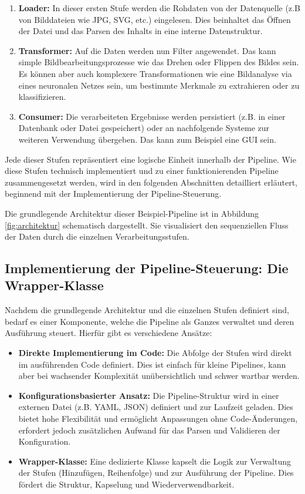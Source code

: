 \documentclass[a4paper]{article} %
\begin{document}
\begin{enumerate}
    \item \textbf{Loader:} In dieser ersten Stufe werden die Rohdaten von der Datenquelle (z.B von Bilddateien wie JPG, SVG, etc.) eingelesen. Dies beinhaltet das Öffnen der Datei und das Parsen des Inhalts in eine interne Datenstruktur.
    \item \textbf{Transformer:} Auf die Daten werden nun Filter angewendet. Das kann simple Bildbearbeitungsprozesse wie das Drehen oder Flippen des Bildes sein. Es können aber auch komplexere Transformationen wie eine Bildanalyse via eines neuronalen Netzes sein, um bestimmte Merkmale zu extrahieren oder zu klassifizieren.
    \item \textbf{Consumer:} Die verarbeiteten Ergebnisse werden persistiert (z.B. in einer Datenbank oder Datei gespeichert) oder an nachfolgende Systeme zur weiteren Verwendung übergeben. Das kann zum Beispiel eine GUI sein.
\end{enumerate}

Jede dieser Stufen repräsentiert eine logische Einheit innerhalb der Pipeline. Wie diese Stufen technisch implementiert und zu einer funktionierenden Pipeline zusammengesetzt werden, wird in den folgenden Abschnitten detailliert erläutert, beginnend mit der Implementierung der Pipeline-Steuerung.

Die grundlegende Architektur dieser Beispiel-Pipeline ist in Abbildung \ref{fig:architektur} schematisch dargestellt. Sie visualisiert den sequenziellen Fluss der Daten durch die einzelnen Verarbeitungsstufen.

\subsection{Implementierung der Pipeline-Steuerung: Die Wrapper-Klasse}
Nachdem die grundlegende Architektur und die einzelnen Stufen definiert sind, bedarf es einer Komponente, welche die Pipeline als Ganzes verwaltet und deren Ausführung steuert. Hierfür gibt es verschiedene Ansätze:

\begin{itemize}
    \item \textbf{Direkte Implementierung im Code:} Die Abfolge der Stufen wird direkt im ausführenden Code definiert. Dies ist einfach für kleine Pipelines, kann aber bei wachsender Komplexität unübersichtlich und schwer wartbar werden.
    \item \textbf{Konfigurationsbasierter Ansatz:} Die Pipeline-Struktur wird in einer externen Datei (z.B. YAML, JSON) definiert und zur Laufzeit geladen. Dies bietet hohe Flexibilität und ermöglicht Anpassungen ohne Code-Änderungen, erfordert jedoch zusätzlichen Aufwand für das Parsen und Validieren der Konfiguration.
    \item \textbf{Wrapper-Klasse:} Eine dedizierte Klasse kapselt die Logik zur Verwaltung der Stufen (Hinzufügen, Reihenfolge) und zur Ausführung der Pipeline. Dies fördert die Struktur, Kapselung und Wiederverwendbarkeit.
\end{itemize}
\end{document}
